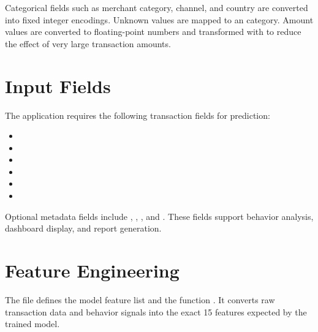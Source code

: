 \documentclass[12pt,a4paper]{report}
\begin{document}
Categorical fields such as merchant category, channel, and country are converted into fixed integer encodings. Unknown values are mapped to an  category. Amount values are converted to floating-point numbers and transformed with  to reduce the effect of very large transaction amounts.

\section{Input Fields}
The application requires the following transaction fields for prediction:
\begin{itemize}
    \item {}
    \item {}
    \item {}
    \item {}
    \item {}
    \item {}
\end{itemize}

Optional metadata fields include , , , and . These fields support behavior analysis, dashboard display, and report generation.

\section{Feature Engineering}
The file  defines the model feature list and the function . It converts raw transaction data and behavior signals into the exact 15 features expected by the trained model.
\end{document}
